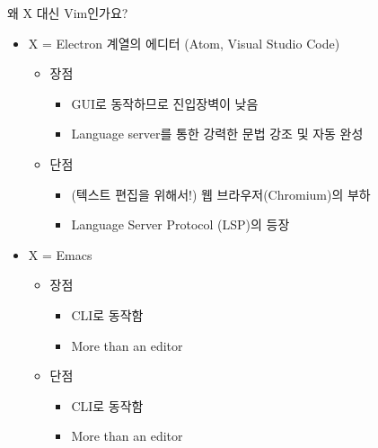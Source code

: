 \documentclass{beamer}
\begin{document}
\begin{frame}{왜 X 대신 Vim인가요?}
  \begin{itemize}
    \item X = Electron 계열의 에디터 (Atom, Visual Studio Code)\pause
      \begin{itemize}
        \item 장점
          \begin{itemize}
            \item GUI로 동작하므로 진입장벽이 낮음\pause
            \item \alert{Language server}를 통한 강력한 문법 강조 및 자동
              완성\pause
          \end{itemize}
        \item 단점
          \begin{itemize}
            \item (텍스트 편집을 위해서!) 웹 브라우저(Chromium)의 부하\pause
            \item \alert{Language Server Protocol (LSP)}의 등장\pause
          \end{itemize}
      \end{itemize}
    \item X = Emacs\pause
      \begin{itemize}
        \item 장점
          \begin{itemize}
            \item CLI로 동작함\pause
            \item More than an editor\pause
          \end{itemize}
        \item 단점\pause
          \begin{itemize}
            \item CLI로 동작함
            \item More than an editor
          \end{itemize}
      \end{itemize}
  \end{itemize}
\end{frame}
\end{document}
